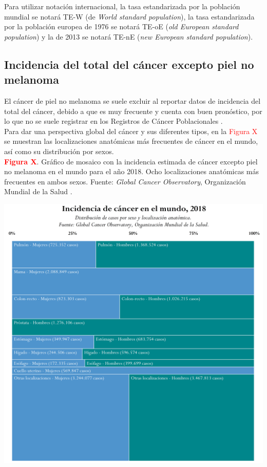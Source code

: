 Para utilizar notación internacional, la tasa estandarizada por la población mundial se notará TE-W (de \textit{World standard population}), la tasa estandarizada por la población europea de 1976 se notará TE-oE (\textit{old European standard population}) y la de 2013 se notará TE-nE (\textit{new European standard population}).\\


\subsection{Incidencia del total del cáncer excepto piel no melanoma}

El cáncer de piel no melanoma se suele excluir al reportar datos de incidencia del total del cáncer, debido a que es muy frecuente y cuenta con buen pronóstico, por lo que no se suele registrar en los Registros de Cáncer Poblacionales \cite{Gordon2013, Madan2010}.\\

Para dar una perspectiva global del cáncer y sus diferentes tipos, en la \textcolor{red}{Figura X} se muestran las localizaciones anatómicas más frecuentes de cáncer en el mundo, así como su distribución por sexos.\\

\textbf{\textcolor{red}{Figura X}}. Gráfico de mosaico con la incidencia estimada de cáncer excepto piel no melanoma en el mundo para el año 2018. Ocho localizaciones anatómicas más frecuentes en ambos sexos. Fuente: \textit{Global Cancer Observatory}, Organización Mundial de la Salud \cite{GCO}.
\begin{center}
	\includegraphics[width=1\textwidth]{figuras/marimekko_gco_incidencia.png} \\
\end{center}

